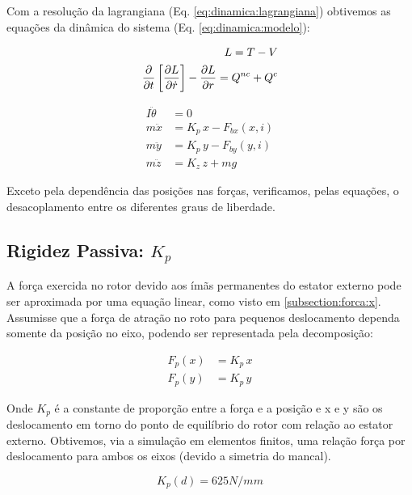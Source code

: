   Com a resolução da lagrangiana (Eq. \ref{eq:dinamica:lagrangiana}) obtivemos as equações da dinâmica do sistema (Eq. \ref{eq:dinamica:modelo}):
  
   \begin{align}
   		L = T - V \notag \\
   		\frac{\partial}{\partial t} \left[ \frac{\partial L}{\partial \dot{r}} \right] -  \frac{\partial L}{\partial r} = Q^{nc} + Q^{c}
   		\label{eq:dinamica:lagrangiana}
   \end{align}
  
 	\begin{align}
 	I \ddot{\theta} &= 0 \\
 	m \ddot{x}		&= K_p \, x  - F_{bx}(x,i) \\
 	m \ddot{y}		&= K_p \, y  - F_{by}(y,i) \label{eq:dinamica:rotor:radial}\\	
 	m \ddot{z}  	&= K_z \, z + m g 
 	\label{eq:dinamica:modelo}
 	\end{align}	
 
 Exceto pela dependência das posições nas forças, verificamos, pelas equações, o desacoplamento entre os diferentes graus de liberdade. 

\subsection{Rigidez Passiva: $K_p$}

A força exercida no rotor devido aos ímãs permanentes do estator externo pode ser aproximada por uma equação linear, como visto em \ref{subsection:forca:x}. Assumisse que a força de atração no roto para pequenos deslocamento dependa somente da posição no eixo, podendo ser representada pela decomposição:

\begin{align}
	F_p(x) &= K_p \, x \\
	F_p(y) &= K_p \, y 
\end{align}

Onde $K_p$ é a constante de proporção entre a força e a posição e x e y são os deslocamento em torno do ponto de equilíbrio do rotor com relação ao estator externo. Obtivemos, via a simulação em elementos finitos, uma relação força por deslocamento para ambos os eixos (devido a simetria do mancal). 

\begin{equation}
 K_p(d) = 625 N/mm 
\end{equation}

